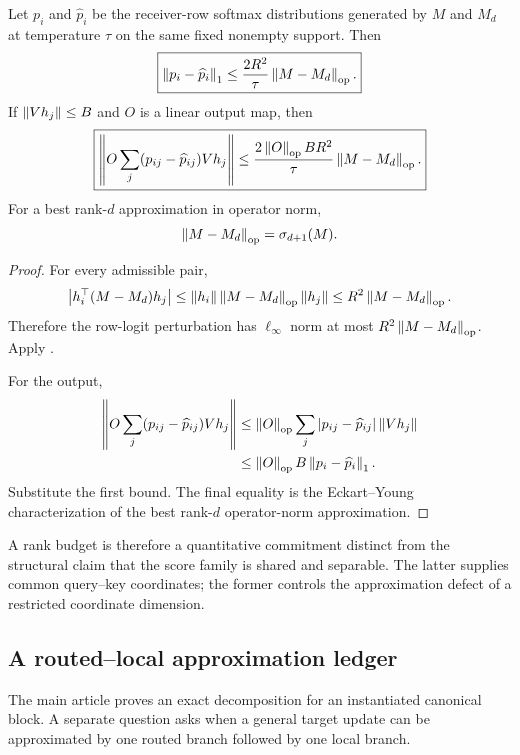 \begin{proposition}\label{prop:supp-rank-error}
Let $p_i$ and $\widehat p_i$ be the receiver-row softmax distributions generated by $M$ and $M_d$ at temperature $\tau$ on the same fixed nonempty support. Then
\[
\boxed{
\left\lVert p_i-\widehat p_i\right\rVert_1
\le
\frac{2R^2}{\tau}
\left\lVert M-M_d\right\rVert_{\mathrm{op}}.
}
\]
If $\left\lVert Vh_j\right\rVert\le B$ and $O$ is a linear output map, then
\[
\boxed{
\left\lVert 
O\sum_j(p_{ij}-\widehat p_{ij})Vh_j
\right\rVert
\le
\frac{2\left\lVert O\right\rVert_{\mathrm{op}}BR^2}{\tau}
\left\lVert M-M_d\right\rVert_{\mathrm{op}}.
}
\]
For a best rank-$d$ approximation in operator norm,
\[
\left\lVert M-M_d\right\rVert_{\mathrm{op}}=\sigma_{d+1}(M).
\]
\end{proposition}

\begin{proof}
For every admissible pair,
\[
\left|h_i^\top(M-M_d)h_j\right|
\le
\left\lVert h_i\right\rVert\left\lVert M-M_d\right\rVert_{\mathrm{op}}\left\lVert h_j\right\rVert
\le
R^2\left\lVert M-M_d\right\rVert_{\mathrm{op}}.
\]
Therefore the row-logit perturbation has $\ell_\infty$ norm at most $R^2\left\lVert M-M_d\right\rVert_{\mathrm{op}}$. Apply .

For the output,
\[
\begin{aligned}
\left\lVert 
O\sum_j(p_{ij}-\widehat p_{ij})Vh_j
\right\rVert
&\le
\left\lVert O\right\rVert_{\mathrm{op}}
\sum_j\left|p_{ij}-\widehat p_{ij}\right|\left\lVert Vh_j\right\rVert\\
&\le
\left\lVert O\right\rVert_{\mathrm{op}}B\left\lVert p_i-\widehat p_i\right\rVert_1.
\end{aligned}
\]
Substitute the first bound. The final equality is the Eckart--Young characterization of the best rank-$d$ operator-norm approximation.
\end{proof}

A rank budget is therefore a quantitative commitment distinct from the structural claim that the score family is shared and separable. The latter supplies common query--key coordinates; the former controls the approximation defect of a restricted coordinate dimension.

\subsection{A routed--local approximation ledger}

The main article proves an exact decomposition for an instantiated canonical block. A separate question asks when a general target update can be approximated by one routed branch followed by one local branch.

